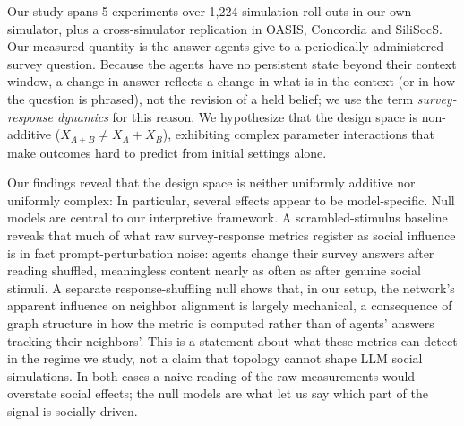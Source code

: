 \documentclass[letterpaper]{article} %
\begin{document}
Our study spans 5 experiments over 1,224 simulation roll-outs in our own simulator, plus a cross-simulator replication in OASIS, Concordia and SiliSocS. Our measured quantity is the answer agents give to a periodically administered survey question. Because the agents have no persistent state beyond their context window, a change in answer reflects a change in what is in the context (or in how the question is phrased), not the revision of a held belief; we use the term \emph{survey-response dynamics} for this reason. We hypothesize that the design space is non-additive ($X_{A+B} \neq X_A + X_B$), exhibiting complex parameter interactions that make outcomes hard to predict from initial settings alone.


Our findings reveal that the design space is neither uniformly additive nor uniformly complex: In particular, several effects appear to be model-specific. Null models are central to our interpretive framework. A scrambled-stimulus baseline reveals that much of what raw survey-response metrics register as social influence is in fact prompt-perturbation noise: agents change their survey answers after reading shuffled, meaningless content nearly as often as after genuine social stimuli. A separate response-shuffling null shows that, in our setup, the network's apparent influence on neighbor alignment is largely mechanical, a consequence of graph structure in how the metric is computed rather than of agents' answers tracking their neighbors'. This is a statement about what these metrics can detect in the regime we study, not a claim that topology cannot shape LLM social simulations. In both cases a naive reading of the raw measurements would overstate social effects; the null models are what let us say which part of the signal is socially driven.

\end{document}
